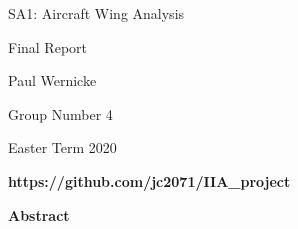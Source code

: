 \begin{titlepage}
    \begin{center}
 
        \LARGE
        SA1: Aircraft Wing Analysis
        
        \vspace{0.1cm}
        
        \LARGE
        
        Final Report
        
        \vspace{0.4cm}
        
        \large
        
        Paul Wernicke
        
        \vspace{0cm}
        
        Group Number 4
        
        \vspace{0.3cm}
        
        Easter Term 2020
        
        \vspace{0.3cm}
        
        \textbf{https://github.com/jc2071/IIA\_project}
        
        \vspace{0.3cm}
        
        
        \textbf{Abstract}
        
        
        \tableofcontents
    \end{center}
\end{titlepage}